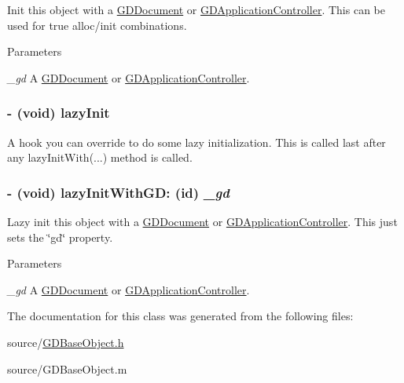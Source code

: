 Init this object with a \hyperlink{interface_g_d_document}{GDDocument} or \hyperlink{interface_g_d_application_controller}{GDApplicationController}. This can be used for true alloc/init combinations.


\begin{DoxyParams}{Parameters}
\item[{\em \_\-gd}]A \hyperlink{interface_g_d_document}{GDDocument} or \hyperlink{interface_g_d_application_controller}{GDApplicationController}. \end{DoxyParams}
\hypertarget{interface_g_d_base_object_a5a8c3d322aa160d7dc572d17c928b56e}{
\subsubsection[{lazyInit}]{\setlength{\rightskip}{0pt plus 5cm}-\/ (void) lazyInit }}
\label{interface_g_d_base_object_a5a8c3d322aa160d7dc572d17c928b56e}


A hook you can override to do some lazy initialization. This is called last after any lazyInitWith(...) method is called. \hypertarget{interface_g_d_base_object_a5c80c746c3a6a2455d43aa12cf87a423}{
\subsubsection[{lazyInitWithGD:}]{\setlength{\rightskip}{0pt plus 5cm}-\/ (void) lazyInitWithGD: (id) {\em \_\-gd}}}
\label{interface_g_d_base_object_a5c80c746c3a6a2455d43aa12cf87a423}


Lazy init this object with a \hyperlink{interface_g_d_document}{GDDocument} or \hyperlink{interface_g_d_application_controller}{GDApplicationController}. This just sets the \char`\"{}gd\char`\"{} property.


\begin{DoxyParams}{Parameters}
\item[{\em \_\-gd}]A \hyperlink{interface_g_d_document}{GDDocument} or \hyperlink{interface_g_d_application_controller}{GDApplicationController}. \end{DoxyParams}


The documentation for this class was generated from the following files:\begin{DoxyCompactItemize}
\item 
source/\hyperlink{_g_d_base_object_8h}{GDBaseObject.h}\item 
source/GDBaseObject.m\end{DoxyCompactItemize}
